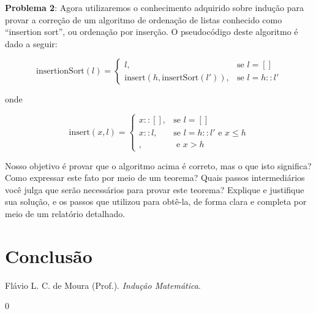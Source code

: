 \documentclass[a4paper, 10pt]{article}
\begin{document}
\textbf{Problema 2}: Agora utilizaremos o conhecimento adquirido sobre indução para provar a correção de um algoritmo de ordenação de listas conhecido como ``insertion sort'', ou ordenação por inserção. O pseudocódigo deste algoritmo é dado a seguir:

    \begin{equation*}
        \textrm{insertionSort}(l) =
        \left\{
      \begin{array}{ll}
        l, & \textrm{se } l = [] \\
        \textrm{insert}(h, \textrm{insertSort}(l')), & \textrm{se } l = h :: l'
      \end{array}
    \right.
    \end{equation*}
		
onde 

    \begin{equation*}
        \textrm{insert}(x,l) =
        \left\{
      \begin{array}{ll}
        x::[], & \textrm{se } l = [] \\
        x::l, & \textrm{se } l = h::l' \textrm{ e } x \leq h \\
        , & \textrm{ e } x > h 
      \end{array}
    \right.
    \end{equation*}

Nosso objetivo é provar que o algoritmo acima é correto, mas o que isto significa? Como expressar este fato por meio de um teorema? Quais passos intermediários você julga que serão necessários para provar este teorema? Explique e justifique sua solução, e os passos que utilizou para obtê-la, de forma clara e completa por meio de um relatório detalhado\cite{Apostila}.


\section{Conclusão}

\begin{thebibliography}{9}

Flávio L. C. de Moura (Prof.).
\textit{Indução Matemática}.


\end{thebibliography}

0\printindex
\end{document}

